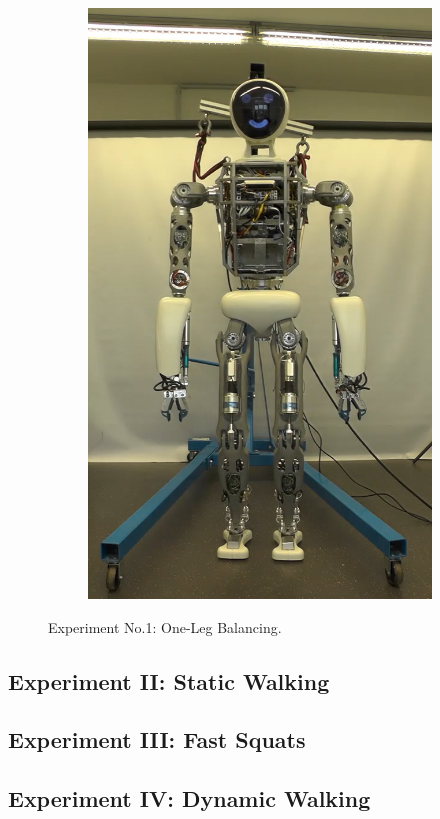 \begin{figure}[h!]
\begin{subfigure}{.2\textwidth}
	\includegraphics[width=.95\linewidth]{experiments/balancing/5}
	\caption{}
	\end{subfigure}%
\caption{Experiment No.1: One-Leg Balancing.}
\label{fig:jumpForward_Snaps}
\end{figure} 

\subsection{Experiment II: Static Walking}
\subsection{Experiment III: Fast Squats}
\subsection{Experiment IV: Dynamic Walking}




























